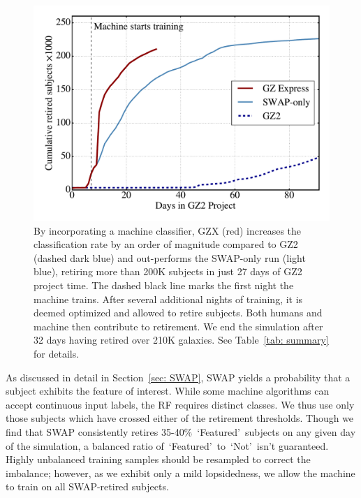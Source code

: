 \documentclass[twocolumn,  trackchanges,]{aastex6}%
\newcommand{\feat}{`Featured'}
\newcommand{\notfeat}{`Not'}
\begin{document}
\begin{figure}[t!]
\centering
\includegraphics[width=5.5in]{f7.pdf}
\caption{By incorporating a machine classifier, GZX (red) increases the classification rate by an order of magnitude compared to GZ2 (dashed dark blue) and out-performs the SWAP-only run (light blue), retiring more than 200K subjects in just 27 days of GZ2 project time. The dashed black line marks the first night the machine trains. After several additional nights of training, it is deemed optimized and allowed to retire subjects. Both humans and machine then contribute to retirement. We end the simulation after 32 days having retired over 210K galaxies. See Table~\ref{tab: summary} for details. \label{fig: money}}
\end{figure}


As discussed in detail in Section~\ref{sec: SWAP}, SWAP yields a probability that 
a subject exhibits the feature of interest. While some machine algorithms can 
accept continuous input labels, the RF requires distinct classes. We thus use only 
those subjects which have crossed either of the retirement thresholds. 
Though we find that SWAP consistently retires 35-40\%~\feat~subjects on 
any given day of the simulation, a balanced ratio of~\feat~to~\notfeat~isn't guaranteed.
 Highly unbalanced training samples should be resampled to correct the imbalance; 
however, as we exhibit only a mild lopsidedness, we allow the machine to train on all 
SWAP-retired subjects.  
\end{document}
